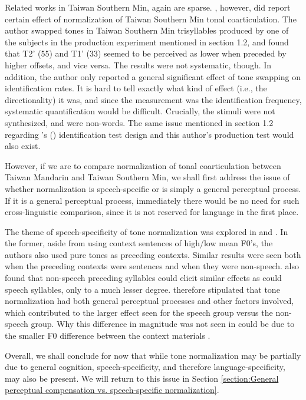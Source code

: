 \documentclass[12pt]{report}
\begin{document}
\begin{CJK}{UTF8}{bsmi}
Related works in Taiwan Southern Min, again are sparse. \cite{Wang2002}, however, did report certain effect of normalization of Taiwan Southern Min tonal coarticulation. The author swapped tones in Taiwan Southern Min trisyllables produced by one of the subjects in the production experiment mentioned in section 1.2, and found that T2' (55) and T1' (33) seemed to be perceived as lower when preceded by higher offsets, and vice versa. The results were not systematic, though. In addition, the author only reported a general significant effect of tone swapping on identification rates. It is hard to tell exactly what kind of effect (i.e., the directionality) it was, and since the measurement was the identification frequency, systematic quantification would be difficult. Crucially, the stimuli were not synthesized, and were non-words. The same issue mentioned in section 1.2 regarding \citeauthor{Peng1997}'s (\citeyear{Peng1997}) identification test design and this author's production test would also exist.

However, if we are to compare normalization of tonal coarticulation between Taiwan Mandarin and Taiwan Southern Min, we shall first address the issue of whether normalization is speech-specific or is simply a general perceptual process. If it is a general perceptual process, immediately there would be no need for such cross-linguistic comparison, since it is not reserved for language in the first place.

The theme of speech-specificity of tone normalization was explored in \cite{HuangHolt2009} and \cite{Zhangetal2022}. In the former, aside from using context sentences of high/low mean F0's, the authors also used pure tones as preceding contexts. Similar results were seen both when the preceding contexts were sentences and when they were non-speech. \cite{Zhangetal2022} also found that non-speech preceding syllables could elicit similar effects as could speech syllables, only to a much lesser degree. \cite{Zhangetal2022} therefore stipulated that tone normalization had both general perceptual processes and other factors involved, which contributed to the larger effect seen for the speech group versus the non-speech group. Why this difference in magnitude was not seen in \cite{HuangHolt2009} could be due to the smaller F0 difference between the context materials \citep{Zhangetal2022}.

Overall, we shall conclude for now that while tone normalization may be partially due to general cognition, speech-specificity, and therefore language-specificity, may also be present. We will return to this issue in Section \ref{section:General perceptual compensation vs. speech-specific normalization}.


\end{CJK}
\end{document}
